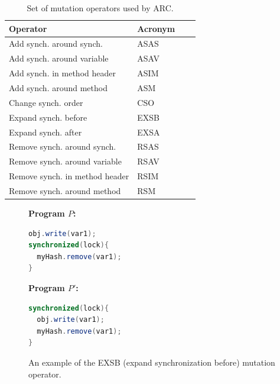 \begin{table}[h]
\caption{Set of mutation operators used by ARC.}
\begin{center}
\begin{tabular}{|l|l|c|c|}
\hline
\textbf{Operator} & \textbf{Acronym} \\
\hline
Add synch. around synch. & ASAS \\
\hline
Add synch. around variable & ASAV \\
\hline
Add synch. in method header & ASIM \\
\hline
Add synch. around method & ASM  \\
\hline
Change synch. order & CSO  \\
\hline
Expand synch. before & EXSB  \\
\hline
Expand synch. after & EXSA  \\
\hline
Remove synch. around synch. & RSAS  \\
\hline
Remove synch. around variable & RSAV  \\
\hline
Remove synch. in method header & RSIM  \\
\hline
Remove synch. around method & RSM  \\
\hline
\end{tabular}
\label{tbl:operators}
\end{center}
\end{table}

\begin{figure}[h]
\vspace{2mm}
\begin{minipage}{5cm}

\footnotesize{\textbf{ Program $P$:}}
\begin{lstlisting}[language=Java, morekeywords={synchronize}]
obj.write(var1);
synchronized(lock){
  myHash.remove(var1);
}
\end{lstlisting}
\end{minipage}\hfill
\begin{minipage}{5cm}
\footnotesize{\textbf{ Program $P'$:}}
\begin{lstlisting}[language=Java, morekeywords={synchronize}]
synchronized(lock){
  obj.write(var1);
  myHash.remove(var1);
}
\end{lstlisting}
\end{minipage}

\caption{An example of the EXSB (expand synchronization before) mutation
operator.}
\label{fig:EXSB_example}
\end{figure}

